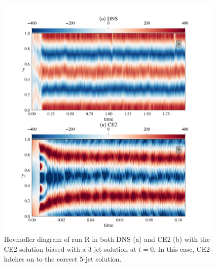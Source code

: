 \documentclass{jfm}
\begin{document}
\begin{figure}[h]
  \centering
  \includegraphics[width=\textwidth]{../../figs/hov_cu_dns_ce2_run_S.pdf}
  \caption{Hovmoller diagram of run R in both DNS (a) and CE2 (b) with the CE2 solution biased with a 3-jet solution at $t=0$. In this case, CE2 latches on to the correct 5-jet solution.}
  \label{fig:hov_run_R}
\end{figure}
\end{document}
